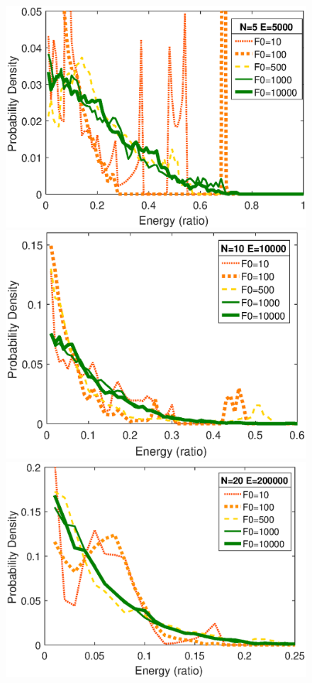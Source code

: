 \documentclass[aps,pre,twocolumn,groupedaddress]{revtex4-1}
\begin{document}
\begin{figure}[hbtp]
\centering
\includegraphics[scale=0.5]{ZhiyuPictures/N=5_energydistribution_pre_rev1.eps} 
\includegraphics[scale=0.5]{ZhiyuPictures/N=10_energydistribution_pre_rev1.eps}
\includegraphics[scale=0.5]{ZhiyuPictures/N=20_energydistribution_pre_rev1.eps}

\end{figure}
\end{document}
